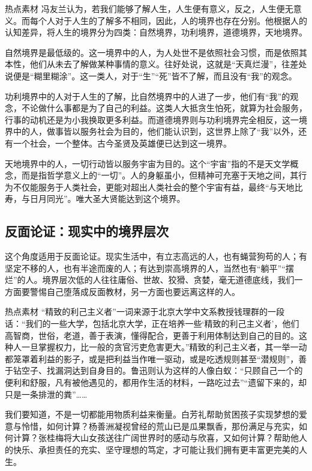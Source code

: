 \begin{quoteBox}{热点素材}
冯友兰认为，若我们能够了解人生，人生便有意义，反之，人生便无意义。而每个人对于人生的了解多不相同，因此，人的境界也存在分别。他根据人的认知差异，将人生的境界分为四类：自然境界，功利境界，道德境界，天地境界。

自然境界是最低级的。这一境界中的人，为人处世不是依照社会习惯，而是依照其本性，他们从未去了解做某种事情的意义。往好处说，这就是“天真烂漫”，往差处说便是“糊里糊涂”。这一类人，对于“生”“死”皆不了解，而且没有“我”的观念。

功利境界中的人对于人生的了解，比自然境界中的人进了一步，他们有“我”的观念，不论做什么事都是为了自己的利益。这类人大抵贪生怕死，就算为社会服务，行事的动机还是为小我换取更多利益。而道德境界则与功利境界完全相反，这一境界中的人，做事皆以服务社会为目的，他们能认识到，这世界上除了“我”以外，还有一个社会，一个整体。古今圣贤及英雄便已达到这一境界。

天地境界中的人，一切行动皆以服务宇宙为目的。这个“宇宙”指的不是天文学概念，而是指哲学意义上的“一切”。人的身躯虽小，但精神可充塞于天地之间，其行为不仅能服务于人类社会，更能对超出人类社会的整个宇宙有益，最终“与天地比寿，与日月同光”。唯大圣大贤能达到这个境界。
\end{quoteBox}

\subsection*{反面论证：现实中的境界层次}

这个角度适用于反面论证。现实生活中，有立志高远的人，也有蝇营狗苟的人；有坚定不移的人，也有半途而废的人；有达到崇高境界的人，当然也有“躺平”“摆烂”的人。境界层次低的人往往庸俗、世故、狡猾、贪婪，毫无道德底线，我们一方面要警惕自己堕落成反面教材，另一方面也要远离这样的人。

\begin{quoteBox}{热点素材}
“精致的利己主义者”一词来源于北京大学中文系教授钱理群的一段话：“我们的一些大学，包括北京大学，正在培养一些‘精致的利己主义者’，他们高智商，世俗，老道，善于表演，懂得配合，更善于利用体制达到自己的目的。这种人一旦掌握权力，比一般的贪官污吏危害更大。”精致的利己主义者，其一举一动都笼罩着利益的影子，或是把利益当作唯一驱动，或是吃透规则甚至“潜规则”，善于钻空子、找漏洞达到自身目的。鲁迅则认为这样的人像白蚁：“只顾自己一个的便利和舒服，凡有被他遇见的，都用作生活的材料，一路吃过去”“遗留下来的，却只是一条排泄的粪”……

我们要知道，不是一切都能用物质利益来衡量。白芳礼帮助贫困孩子实现梦想的爱意与怜惜，如何计算？杨善洲凝视曾经的荒山已是瓜果飘香，那份满足与充实，如何计算？张桂梅将大山女孩送往广阔世界时的感动与欣喜，又如何计算？帮助他人的快乐、承担责任的充实、坚守理想的笃定，才可能让我们拥有更丰富更完美的人生。
\end{quoteBox}

